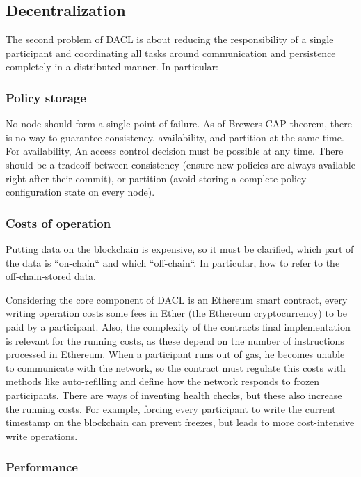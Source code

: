 \documentclass[12pt, conference]{IEEEtran}
\begin{document}
\subsection{Decentralization}

The second problem of DACL is about reducing the responsibility of a single participant and coordinating all tasks around communication and persistence completely in a distributed manner. In particular:

\subsubsection{Policy storage}

No node should form a single point of failure. As of Brewers CAP theorem, there is no way to guarantee consistency, availability, and partition at the same time. For availability, An access control decision must be possible at any time. There should be a tradeoff between consistency (ensure new policies are always available right after their commit), or partition (avoid storing a complete policy configuration state on every node).

\subsubsection{Costs of operation}

Putting data on the blockchain is expensive, so it must be clarified, which part of the data is ``on-chain`` and which ``off-chain``. In particular, how to refer to the off-chain-stored data. 

Considering the core component of DACL is an Ethereum smart contract, every writing operation costs some fees in Ether (the Ethereum cryptocurrency) to be paid by a participant. Also, the complexity of the contracts final implementation is relevant for the running costs, as these depend on the number of instructions processed in Ethereum. When a participant runs out of gas, he becomes unable to communicate with the network, so the contract must regulate this costs with methods like auto-refilling and define how the network responds to frozen participants. There are ways of inventing health checks, but these also increase the running costs. For example, forcing every participant to write the current timestamp on the blockchain can prevent freezes, but leads to more cost-intensive write operations.

\subsubsection{Performance}
\end{document}

